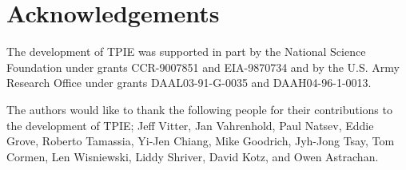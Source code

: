 \chapter*{Acknowledgements}

The development of TPIE was supported in part by the National Science
Foundation under grants CCR-9007851 and EIA-9870734 and by the U.S. Army
Research Office under grants DAAL03-91-G-0035 and DAAH04-96-1-0013.

The authors would like to thank the following people for their
contributions to the development of TPIE; Jeff Vitter, Jan Vahrenhold, Paul
Natsev, Eddie Grove, Roberto Tamassia, Yi-Jen Chiang, Mike Goodrich,
Jyh-Jong Tsay, Tom Cormen, Len Wisniewski, Liddy Shriver, David Kotz, and
Owen Astrachan.



